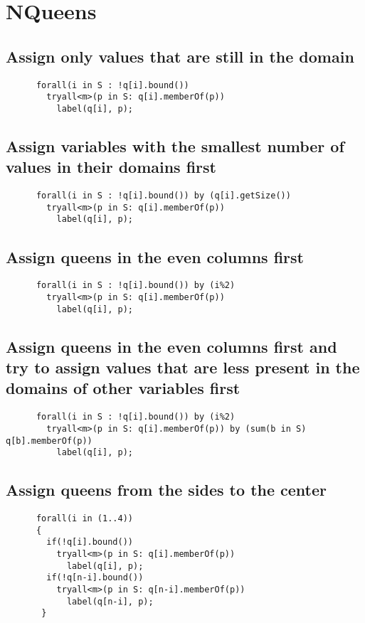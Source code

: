 \documentclass{eplDoc}
\begin{document}
\section{NQueens}
\subsection{Assign only values that are still in the domain}
\begin{lstlisting}
      forall(i in S : !q[i].bound())
        tryall<m>(p in S: q[i].memberOf(p))
          label(q[i], p);
\end{lstlisting}
\subsection{Assign variables with the smallest number of values in their domains first}
\begin{lstlisting}
      forall(i in S : !q[i].bound()) by (q[i].getSize())
        tryall<m>(p in S: q[i].memberOf(p)) 
          label(q[i], p);
\end{lstlisting}
\subsection{Assign queens in the even columns first}    
\begin{lstlisting}  
      forall(i in S : !q[i].bound()) by (i%2) 
        tryall<m>(p in S: q[i].memberOf(p)) 
          label(q[i], p);
\end{lstlisting}          
\subsection{Assign queens in the even columns first and try to assign values that are less present in the domains of other variables first}   
\begin{lstlisting}  
      forall(i in S : !q[i].bound()) by (i%2) 
        tryall<m>(p in S: q[i].memberOf(p)) by (sum(b in S) q[b].memberOf(p))
          label(q[i], p);
\end{lstlisting}          
\subsection{Assign queens from the sides to the center}     
\begin{lstlisting}
      forall(i in (1..4))
      {
        if(!q[i].bound()) 
          tryall<m>(p in S: q[i].memberOf(p))
            label(q[i], p);
        if(!q[n-i].bound()) 
          tryall<m>(p in S: q[n-i].memberOf(p))
            label(q[n-i], p);
       } 
\end{lstlisting}
\end{document}
